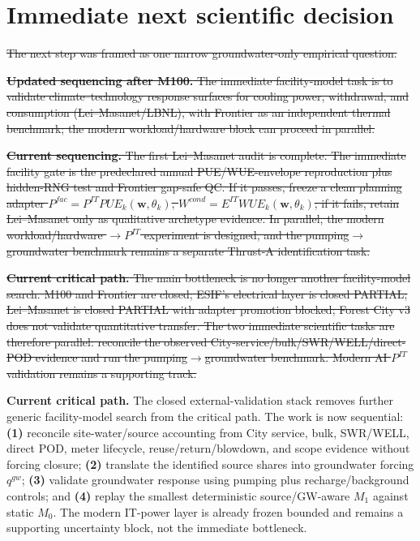 \documentclass[11pt]{article}
\newcommand{\oldtxt}[1]{\textcolor{blue!70!black}{\sout{#1}}}
\newcommand{\latesttxt}[1]{\textcolor{purple!85!black}{#1}}
\begin{document}
\section{Immediate next scientific decision}

\oldtxt{The next step was framed as one narrow groundwater-only empirical question.}

\oldtxt{\textbf{Updated sequencing after M100.} The immediate facility-model task is to validate climate--technology response surfaces for cooling power, withdrawal, and consumption (Lei--Masanet/LBNL), with Frontier as an independent thermal benchmark; the modern workload/hardware block can proceed in parallel.}

\oldtxt{\textbf{Current sequencing.} The first Lei--Masanet audit is complete. The immediate facility gate is the predeclared annual PUE/WUE-envelope reproduction plus hidden-RNG test and Frontier gap-safe QC. If it passes, freeze a clean planning adapter \(P^{fac}=P^{IT}PUE_k(\mathbf w,\theta_k)\), \(W^{cond}=E^{IT}WUE_k(\mathbf w,\theta_k)\); if it fails, retain Lei--Masanet only as qualitative archetype evidence. In parallel, the modern workload/hardware \(\rightarrow P^{IT}\) experiment is designed, and the pumping\(\rightarrow\)groundwater benchmark remains a separate Thrust-A identification task.}

\oldtxt{\textbf{Current critical path.} The main bottleneck is no longer another facility-model search. M100 and Frontier are closed; ESIF's electrical layer is closed PARTIAL; Lei--Masanet is closed PARTIAL with adapter promotion blocked; Forest City v3 does not validate quantitative transfer. The two immediate scientific tasks are therefore parallel: reconcile the observed City-service/bulk/SWR/WELL/direct-POD evidence and run the pumping\(\rightarrow\)groundwater benchmark. Modern AI \(P^{IT}\) validation remains a supporting track.}

\latesttxt{\textbf{Current critical path.} The closed external-validation stack removes further generic facility-model search from the critical path. The work is now sequential: \textbf{(1)} reconcile site-water/source accounting from City service, bulk, SWR/WELL, direct POD, meter lifecycle, reuse/return/blowdown, and scope evidence without forcing closure; \textbf{(2)} translate the identified source shares into groundwater forcing \(q^{gw}\); \textbf{(3)} validate groundwater response using pumping plus recharge/background controls; and \textbf{(4)} replay the smallest deterministic source/GW-aware \(M_1\) against static \(M_0\). The modern IT-power layer is already frozen bounded and remains a supporting uncertainty block, not the immediate bottleneck.}
\end{document}
